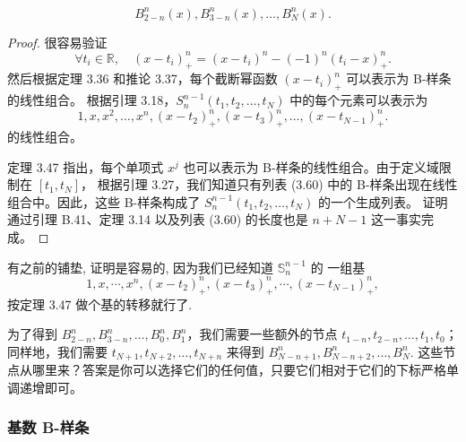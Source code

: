 \documentclass[a4paper]{ctexart}
\begin{document}
{\[
B_{2-n}^{n}(x), B_{3-n}^{n}(x),\ldots, B_{N}^{n}(x). \tag{3.60}
\]

\begin{proof}
很容易验证
\[
\forall t_{i}\in \mathbb{R},\quad\left(x-t_{i}\right)_{+}^{n}=\left(x-t_{i}\right)^{n}-(-1)^{n}\left(t_{i}-x\right)_{+}^{n}.\tag{3.61}
\]
然后根据定理 3.36 和推论 3.37，每个截断幂函数 $\left(x-t_{i}\right)_{+}^{n}$ 可以表示为 B-样条的线性组合。
根据引理 3.18，$S_{n}^{n-1}\left(t_{1}, t_{2},\ldots, t_{N}\right)$ 中的每个元素可以表示为
$$ 1, x, x^{2},\ldots, x^{n},\left(x-t_{2}\right)_{+}^{n},\left(x-t_{3}\right)_{+}^{n},\ldots,\left(x-t_{N-1}\right)_{+}^{n}.$$
的线性组合。

定理 3.47 指出，每个单项式 $x^{j}$ 也可以表示为 B-样条的线性组合。由于定义域限制在 $\left[t_{1}, t_{N}\right]$，
根据引理 3.27，我们知道只有列表 (3.60) 中的 B-样条出现在线性组合中。因此，这些 B-样条构成了 
$S_{n}^{n-1}\left(t_{1}, t_{2},\ldots, t_{N}\right)$ 的一个生成列表。
证明通过引理 B.41、定理 3.14 以及列表 (3.60) 的长度也是 $n+N-1$ 这一事实完成。
\end{proof}

有之前的铺垫, 证明是容易的, 因为我们已经知道 $\mathbb{S}_n^{n - 1}$ 的
一组基
$$
1, x, \cdots, x^n, (x - t_2)_+^n, (x - t_3)_+^n, \cdots, (x - t_{N - 1})_+^n,
$$
按定理 3.47 做个基的转移就行了. 


为了得到 $B_{2-n}^{n}, B_{3-n}^{n},\ldots, B_{0}^{n}, B_{1}^{n}$，我们需要一些额外的节点 $t_{1-n}, t_{2-n}, \ldots, t_{1}, t_{0}$；
同样地，我们需要 $t_{N+1}, t_{N+2}, \ldots, t_{N+n}$ 来得到 $B_{N-n+1}^{n}, B_{N-n+2}^{n}, \ldots, B_{N}^{n}$.
这些节点从哪里来？答案是你可以选择它们的任何值，只要它们相对于它们的下标严格单调递增即可。






\subsubsection{基数 B-样条}

}
\end{document}
